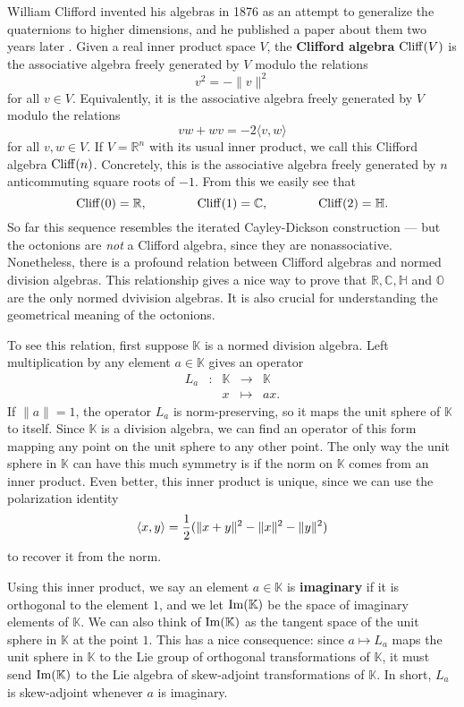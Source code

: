 \documentclass[12pt]{article}
\newcommand\R{{\mathbb R}}
\newcommand\C{{\mathbb C}}
\renewcommand\H{{\mathbb H}}
\newcommand\K{{\mathbb K}}
\renewcommand\O{{\mathbb O}}
\newcommand{\Cliff}{{\rm Cliff}}
\renewcommand{\Im}{{\rm Im}}
\newcommand{\maps}{\colon}
\begin{document}
William Clifford invented his algebras in 1876 as an attempt to
generalize the quaternions to higher dimensions, and he published a
paper about them two years later \cite{Clifford}.  Given a real inner
product space $V$, the {\bf Clifford algebra} $\Cliff(V)$ is the
associative algebra freely generated by $V$ modulo the relations
\[  v^2 = -\|v\|^2 \] 
for all $v \in V$.  Equivalently, it is the associative algebra 
freely generated by $V$ modulo the relations 
\[              vw + wv = -2\langle v,w\rangle    \]  
for all $v, w \in V$.  If $V = \R^n$ with its usual inner product, we 
call this Clifford algebra $\Cliff(n)$.  Concretely, this is the 
associative algebra freely generated by $n$ anticommuting square roots 
of $-1$.  From this we easily see that  
\[  \Cliff(0) = \R, \qquad\qquad \Cliff(1) = \C, \qquad\qquad    
\Cliff(2) = \H .\]   
So far this sequence resembles the iterated Cayley-Dickson construction 
--- but the octonions are {\it not} a Clifford algebra, since they are 
nonassociative.   Nonetheless, there is a profound relation between  
Clifford algebras and normed division algebras.  This relationship gives
a nice way to prove that $\R, \C, \H$ and $\O$ are the only normed  
dvivision algebras.  It is also crucial for understanding the  
geometrical meaning of the octonions.    
  
To see this relation, first suppose $\K$ is a normed division algebra.    
Left multiplication by any element $a \in \K$ gives an operator  
\[   \begin{array}{ccccc}  
       L_a &\maps& \K & \to   &  \K  \\  
           &     & x &\mapsto&   ax .   
\end{array} \]  
If $\|a\| = 1$, the operator $L_a$ is norm-preserving, so it maps the  
unit sphere of $\K$ to itself.  Since $\K$ is a division algebra, we can  
find an operator of this form mapping any point on the unit sphere to  
any other point.  The only way the unit sphere in $\K$ can have this much  
symmetry is if the norm on $\K$ comes from an inner product.  Even better,  
this inner product is unique, since we can use the polarization identity  
\[   \langle x, y\rangle = {1\over 2}(\|x+y\|^2 - \|x\|^2 - \|y\|^2) \]   
to recover it from the norm.     
  
Using this inner product, we say an element $a \in \K$ is {\bf imaginary}  
if it is orthogonal to the element $1$, and we let $\Im(\K)$ be the space  
of imaginary elements of $\K$.  We can also think of $\Im(\K)$ as the  
tangent space of the unit sphere in $\K$ at the point $1$.  This has a  
nice consequence: since $a \mapsto L_a$ maps the unit sphere in $\K$ to  
the Lie group of orthogonal transformations of $\K$, it must send  
$\Im(\K)$ to the Lie algebra of skew-adjoint transformations of $\K$.  
In short, $L_a$ is skew-adjoint whenever $a$ is imaginary.  
  
\end{document}
